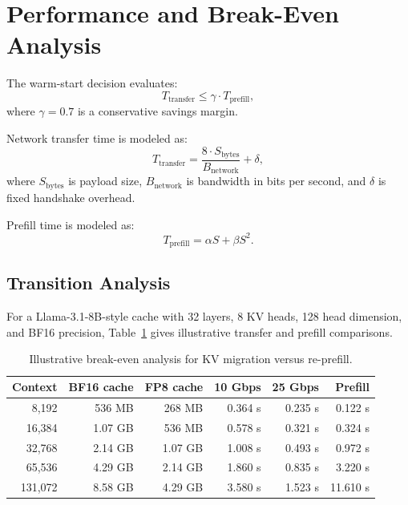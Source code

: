 \documentclass[11pt]{article}
\begin{document}
\section{Performance and Break-Even Analysis}

The warm-start decision evaluates:
\begin{equation}
T_{\text{transfer}} \leq \gamma \cdot T_{\text{prefill}},
\end{equation}
where $\gamma = 0.7$ is a conservative savings margin.

Network transfer time is modeled as:
\begin{equation}
T_{\text{transfer}} = \frac{8 \cdot S_{\text{bytes}}}{B_{\text{network}}} + \delta,
\end{equation}
where $S_{\text{bytes}}$ is payload size, $B_{\text{network}}$ is bandwidth in bits per second, and $\delta$ is fixed handshake overhead.

Prefill time is modeled as:
\begin{equation}
T_{\text{prefill}} = \alpha S + \beta S^2.
\end{equation}

\subsection{Transition Analysis}

For a Llama-3.1-8B-style cache with 32 layers, 8 KV heads, 128 head dimension, and BF16 precision, Table~\ref{tab:break-even} gives illustrative transfer and prefill comparisons.

\begin{table}[h]
\centering
\begin{tabular}{rrrrrr}
\toprule
Context & BF16 cache & FP8 cache & 10 Gbps & 25 Gbps & Prefill \\
\midrule
8,192 & 536 MB & 268 MB & 0.364 s & 0.235 s & 0.122 s \\
16,384 & 1.07 GB & 536 MB & 0.578 s & 0.321 s & 0.324 s \\
32,768 & 2.14 GB & 1.07 GB & 1.008 s & 0.493 s & 0.972 s \\
65,536 & 4.29 GB & 2.14 GB & 1.860 s & 0.835 s & 3.220 s \\
131,072 & 8.58 GB & 4.29 GB & 3.580 s & 1.523 s & 11.610 s \\
\bottomrule
\end{tabular}
\caption{Illustrative break-even analysis for KV migration versus re-prefill.}
\label{tab:break-even}
\end{table}
\end{document}
